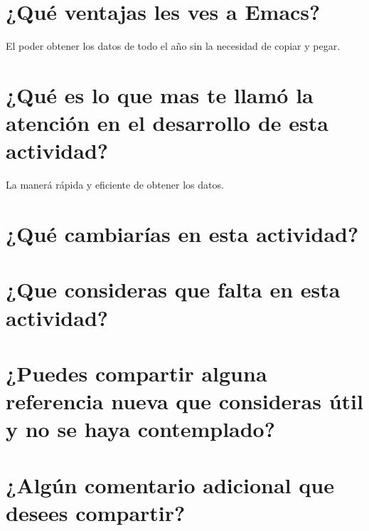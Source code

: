 \documentclass[12pt]{article}
\begin{document}
\section*{¿Qué ventajas les ves a Emacs? }
El poder obtener los datos de todo el año sin la necesidad de copiar y pegar.
\\
\section*{ ¿Qué es lo que mas te llamó la atención en el desarrollo de esta actividad?}
La manerá rápida y eficiente de obtener los datos.
\\
\section*{ ¿Qué cambiarías en esta actividad?}
\section*{¿Que consideras que falta en esta actividad? }
\section*{¿Puedes compartir alguna referencia nueva que consideras útil y no se haya contemplado?}
\section*{¿Algún comentario adicional que desees compartir?}
      
       
         
        
       
       
        
       
         

 
\end{document}

